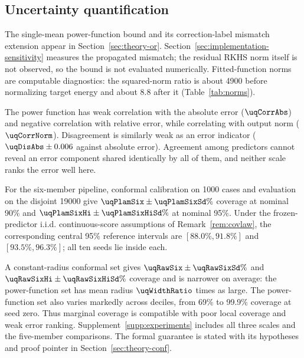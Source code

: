 \subsection{Uncertainty quantification}
\label{sec:uq}
The single-mean power-function bound and its correction-label mismatch extension appear in Section~\ref{sec:theory-or}. Section~\ref{sec:implementation-sensitivity} measures the propagated mismatch; the residual RKHS norm itself is not observed, so the bound is not evaluated numerically. Fitted-function norms are computable diagnostics: the squared-norm ratio is about 4900 before normalizing target energy and about 8.8 after it (Table~\ref{tab:norms}).

The power function has weak correlation with the absolute error ($\uqCorrAbs$) and negative correlation with relative error, while correlating with output norm ($\uqCorrNorm$). Disagreement is similarly weak as an error indicator ($\uqDisAbs\pm0.006$ against absolute error). Agreement among predictors cannot reveal an error component shared identically by all of them, and neither scale ranks the error well here.

For the six-member pipeline, conformal calibration on 1000 cases and evaluation on the disjoint 19000 give $\uqPlamSix\pm\uqPlamSixSd\%$ coverage at nominal 90\% and $\uqPlamSixHi\pm\uqPlamSixHiSd\%$ at nominal 95\%. Under the frozen-predictor i.i.d. continuous-score assumptions of Remark~\ref{rem:covlaw}, the corresponding central 95\% reference intervals are $[88.0\%,91.8\%]$ and $[93.5\%,96.3\%]$; all ten seeds lie inside each.

A constant-radius conformal set gives $\uqRawSix\pm\uqRawSixSd\%$ and $\uqRawSixHi\pm\uqRawSixHiSd\%$ coverage and is narrower on average: the power-function set has mean radius $\uqWidthRatio$ times as large. The power-function set also varies markedly across deciles, from 69\% to 99.9\% coverage at seed zero. Thus marginal coverage is compatible with poor local coverage and weak error ranking. Supplement~\ref{supp:experiments} includes all three scales and the five-member comparisons. The formal guarantee is stated with its hypotheses and proof pointer in Section~\ref{sec:theory-conf}.

